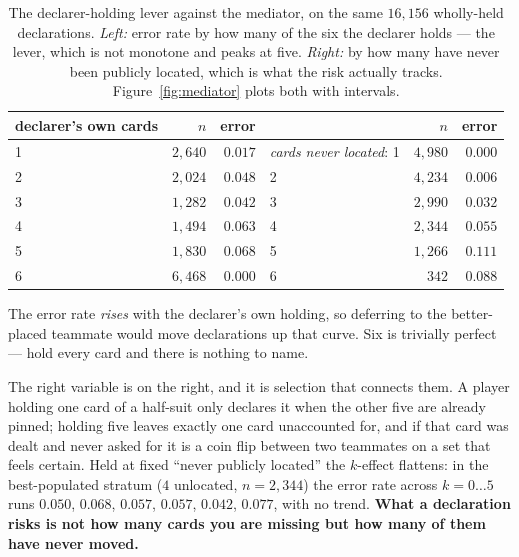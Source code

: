 \documentclass[11pt,letterpaper]{article}
\begin{document}
\begin{table}[t]
\centering
\small
\begin{tabular}{lrrlrr}
\toprule
declarer's own cards & $n$ & error & & $n$ & error \\
\midrule
1 & $2{,}640$ & $0.017$ & \emph{cards never located}: 1 & $4{,}980$ & $0.000$ \\
2 & $2{,}024$ & $0.048$ & \hspace{1em} 2 & $4{,}234$ & $0.006$ \\
3 & $1{,}282$ & $0.042$ & \hspace{1em} 3 & $2{,}990$ & $0.032$ \\
4 & $1{,}494$ & $0.063$ & \hspace{1em} 4 & $2{,}344$ & $0.055$ \\
5 & $1{,}830$ & $\mathbf{0.068}$ & \hspace{1em} 5 & $1{,}266$ & $\mathbf{0.111}$ \\
6 & $6{,}468$ & $0.000$ & \hspace{1em} 6 & $342$ & $0.088$ \\
\bottomrule
\end{tabular}
\caption{The declarer-holding lever against the mediator, on the same $16{,}156$ wholly-held declarations. \emph{Left:} error rate by how many of the six the declarer holds --- the lever, which is not monotone and peaks at five. \emph{Right:} by how many have never been publicly located, which is what the risk actually tracks. Figure~\ref{fig:mediator} plots both with intervals.}
\label{tab:mediator}
\end{table}

The error rate \emph{rises} with the declarer's own holding, so deferring to
the better-placed teammate would move declarations up that curve. Six is
trivially perfect --- hold every card and there is nothing to name.

The right variable is on the right, and it is selection that connects them. A
player holding one card of a half-suit only declares it when the other five are
already pinned; holding five leaves exactly one card unaccounted for, and if
that card was dealt and never asked for it is a coin flip between two teammates
on a set that feels certain. Held at fixed ``never publicly located'' the
$k$-effect flattens: in the best-populated stratum ($4$ unlocated, $n=2{,}344$)
the error rate across $k = 0 \ldots 5$ runs $0.050$, $0.068$, $0.057$, $0.057$,
$0.042$, $0.077$, with no trend. \textbf{What a declaration risks is not how
many cards you are missing but how many of them have never moved.}
\end{document}
